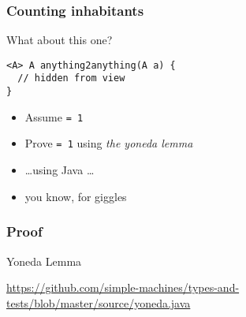\begin{frame}[fragile]
\frametitle{Counting inhabitants}
\begin{block}{What about this one?}
\begin{lstlisting}[style=java]
<A> A anything2anything(A a) {
  // hidden from view 
}
\end{lstlisting}
\end{block}
\begin{center}
\begin{itemize}
\item<1-> Assume \lstinline{= 1}
\item<1-> Prove \lstinline{= 1} using \emph{the yoneda lemma}
\item<2-> \ldots using Java \ldots
\item<2-> you know, for giggles
\end{itemize}
\end{center}
\end{frame}

\begin{frame}[fragile]
\frametitle{Proof}
\begin{block}{Yoneda Lemma}
\begin{center}
\href{https://github.com/simple-machines/types-and-tests/blob/master/source/yoneda.java}{https://github.com/simple-machines/types-and-tests/blob/master/source/yoneda.java}
\end{center}
\end{block}
\end{frame}

